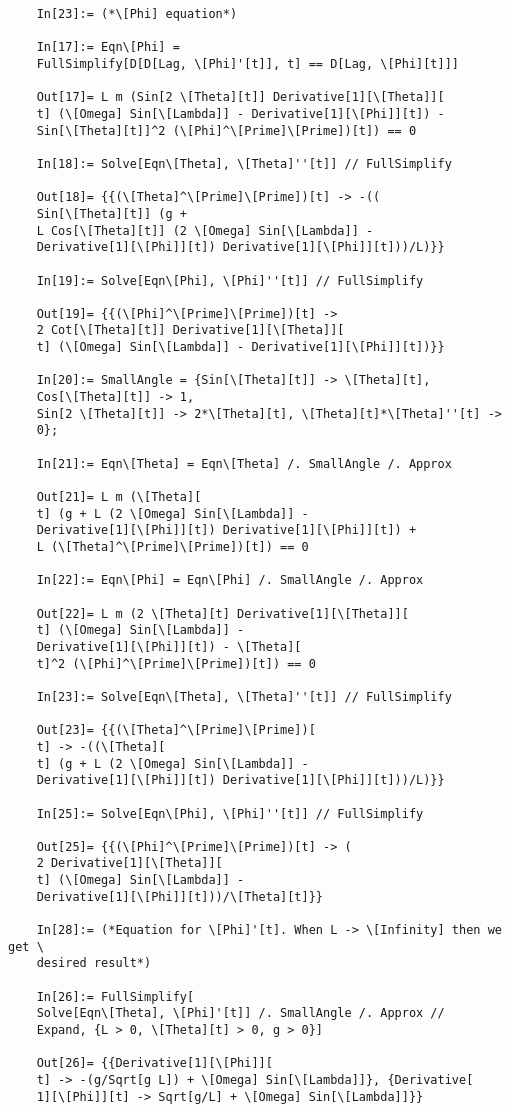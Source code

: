\documentclass{article}
\theoremstyle{definition}
\begin{document}
\begin{enumerate}[label=(\alph*)]
\begin{lstlisting}
	In[23]:= (*\[Phi] equation*)
	
	In[17]:= Eqn\[Phi] = 
	FullSimplify[D[D[Lag, \[Phi]'[t]], t] == D[Lag, \[Phi][t]]]
	
	Out[17]= L m (Sin[2 \[Theta][t]] Derivative[1][\[Theta]][
	t] (\[Omega] Sin[\[Lambda]] - Derivative[1][\[Phi]][t]) - 
	Sin[\[Theta][t]]^2 (\[Phi]^\[Prime]\[Prime])[t]) == 0
	
	In[18]:= Solve[Eqn\[Theta], \[Theta]''[t]] // FullSimplify
	
	Out[18]= {{(\[Theta]^\[Prime]\[Prime])[t] -> -((
	Sin[\[Theta][t]] (g + 
	L Cos[\[Theta][t]] (2 \[Omega] Sin[\[Lambda]] - 
	Derivative[1][\[Phi]][t]) Derivative[1][\[Phi]][t]))/L)}}
	
	In[19]:= Solve[Eqn\[Phi], \[Phi]''[t]] // FullSimplify
	
	Out[19]= {{(\[Phi]^\[Prime]\[Prime])[t] -> 
	2 Cot[\[Theta][t]] Derivative[1][\[Theta]][
	t] (\[Omega] Sin[\[Lambda]] - Derivative[1][\[Phi]][t])}}
	
	In[20]:= SmallAngle = {Sin[\[Theta][t]] -> \[Theta][t], 
	Cos[\[Theta][t]] -> 1, 
	Sin[2 \[Theta][t]] -> 2*\[Theta][t], \[Theta][t]*\[Theta]''[t] -> 
	0};
	
	In[21]:= Eqn\[Theta] = Eqn\[Theta] /. SmallAngle /. Approx
	
	Out[21]= L m (\[Theta][
	t] (g + L (2 \[Omega] Sin[\[Lambda]] - 
	Derivative[1][\[Phi]][t]) Derivative[1][\[Phi]][t]) + 
	L (\[Theta]^\[Prime]\[Prime])[t]) == 0
	
	In[22]:= Eqn\[Phi] = Eqn\[Phi] /. SmallAngle /. Approx
	
	Out[22]= L m (2 \[Theta][t] Derivative[1][\[Theta]][
	t] (\[Omega] Sin[\[Lambda]] - 
	Derivative[1][\[Phi]][t]) - \[Theta][
	t]^2 (\[Phi]^\[Prime]\[Prime])[t]) == 0
	
	In[23]:= Solve[Eqn\[Theta], \[Theta]''[t]] // FullSimplify
	
	Out[23]= {{(\[Theta]^\[Prime]\[Prime])[
	t] -> -((\[Theta][
	t] (g + L (2 \[Omega] Sin[\[Lambda]] - 
	Derivative[1][\[Phi]][t]) Derivative[1][\[Phi]][t]))/L)}}
	
	In[25]:= Solve[Eqn\[Phi], \[Phi]''[t]] // FullSimplify
	
	Out[25]= {{(\[Phi]^\[Prime]\[Prime])[t] -> (
	2 Derivative[1][\[Theta]][
	t] (\[Omega] Sin[\[Lambda]] - 
	Derivative[1][\[Phi]][t]))/\[Theta][t]}}
	
	In[28]:= (*Equation for \[Phi]'[t]. When L -> \[Infinity] then we get \
	desired result*)
	
	In[26]:= FullSimplify[
	Solve[Eqn\[Theta], \[Phi]'[t]] /. SmallAngle /. Approx // 
	Expand, {L > 0, \[Theta][t] > 0, g > 0}]
	
	Out[26]= {{Derivative[1][\[Phi]][
	t] -> -(g/Sqrt[g L]) + \[Omega] Sin[\[Lambda]]}, {Derivative[
	1][\[Phi]][t] -> Sqrt[g/L] + \[Omega] Sin[\[Lambda]]}}
	\end{lstlisting}
\end{enumerate}
\end{document}
